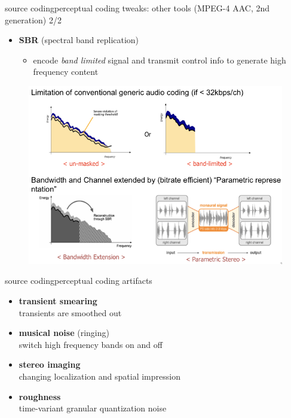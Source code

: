     \begin{frame}{source coding}{perceptual coding tweaks: other tools (MPEG-4 AAC, 2nd generation) 2/2}
        \begin{itemize}
            \item	\textbf{SBR} (spectral band replication)
                \begin{itemize}
                    \item encode \textit{band limited} signal and transmit control info to generate high frequency content
                \end{itemize}
		\end{itemize}
        \begin{figure}
            \includegraphics[scale=.5]{graph/sbr}
        \end{figure}
	\end{frame}
	
	\begin{frame}{source coding}{perceptual coding artifacts}
		\begin{itemize}
			\item	\textbf{transient smearing}\\
					transients are smoothed out
			\smallskip
            \item	\textbf{musical noise} (ringing)\\
					switch high frequency bands on and off
			\smallskip
            \item	\textbf{stereo imaging}\\
					changing localization and spatial impression
			\smallskip
            \item	\textbf{roughness}\\
					time-variant granular quantization noise
		\end{itemize}
	\end{frame}
	
